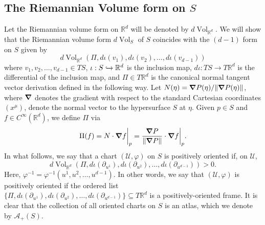 \documentclass{article}
\newcommand{\R}{\mathbb{R}}
\newcommand{\f}[2]{\frac{#1}{#2}}
\theoremstyle{theorem}
\newcommand{\Vol}{\operatorname{Vol}}
\begin{document}
\subsection{The Riemannian Volume form on $S$}
Let the Riemannian volume form on $\mathbb{R}^d$ will be denoted by $d\Vol_{\mathbb{R}^d}$. We will show that the Riemannian volume form $d\Vol_S$ of $S$ coincides with the $(d-1)$ form on $S$ given by
\begin{equation*}
    d\Vol_{\R^d}(\Pi, d\iota(v_1), d\iota(v_2),\dots, d\iota(v_{d-1}))
\end{equation*}
where $v_1,v_2,\dots,v_{d-1}\in TS$, $\iota: S\xhookrightarrow{} \R^d$ is the inclusion map,  $d\iota : TS \to T\R^d$ is the differential of the inclusion map,  and $\Pi\in T\mathbb{R}^d$ is the canonical normal tangent vector derivation defined in the following way. Let $N(\eta) = \grad P(\eta) /\norm{\grad P(\eta)}$, where $\grad$ denotes the gradient with respect to the standard Cartesian coordinates $(x^\mu)$, denote the normal vector to the hypersurface $S$ at $\eta$. Given $p\in S$ and $f\in C^{\infty}(\mathbb{R}^d)$, we define $\Pi$ via
\begin{equation*}
\Pi(f) = N \cdot \grad f \bigg\vert_{p} = \f{\grad P}{\norm{\grad P}}  \cdot \grad f \bigg\vert_{p}.
\end{equation*} 
In what follows, we say that a chart $(\mathcal{U},\varphi)$ on $S$ is positively oriented if, on $\mathcal{U}$,
\begin{equation*}
d\Vol_{\mathbb{R}^d}(\Pi,d\iota(\partial_{u^1}),d\iota(\partial_{u^2}),\dots,d\iota(\partial_{u^{d-1}}))>0.
\end{equation*}
Here, $\varphi^{-1} = \varphi^{-1}(u^1,u^2,\dots, u^{d-1})$. In other words, we say that $(\mathcal{U},\varphi)$ is positively oriented if the ordered list $\{\Pi,d\iota(\partial_{u^1}),d\iota(\partial_{u^2}),\dots,d\iota(\partial_{u^{d-1}})\}\subseteq T\mathbb{R}^d$ is a positively-oriented frame. It is clear that the collection of all oriented charts on $S$ is an atlas, which we denote by $\mathcal{A}_+(S)$.\\
\end{document}
